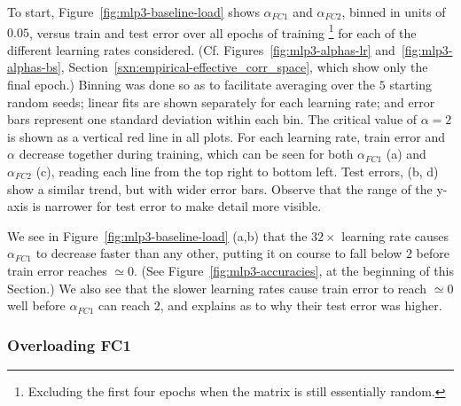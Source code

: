 
To start, Figure~\ref{fig:mlp3-baseline-load} shows $\alpha_{FC1}$ and $\alpha_{FC2}$, binned in units of $0.05$, versus 
train and test error over all epochs of training
\footnote{Excluding the first four epochs when the matrix is still essentially random.} 
for each of the different learning rates considered. 
(Cf. Figures~\ref{fig:mlp3-alphas-lr} and~\ref{fig:mlp3-alphas-bs}, Section~\ref{sxn:empirical-effective_corr_space},
which show only the final epoch.)
Binning was done so as to facilitate averaging over the $5$ starting random seeds; 
linear fits are shown separately for each learning rate; and
error bars represent one standard deviation within each bin. 
The critical value of $\alpha=2$ is shown as a vertical red line in all plots. 
For each learning rate, train error and $\alpha$ decrease together during training, which can be seen for both 
$\alpha_{FC1}$ (a) and $\alpha_{FC2}$ (c), reading each line from the top right to bottom left. Test errors, (b, d) show 
a similar trend, but with wider error bars. 
Observe that the range of the y-axis is narrower for test error to make detail more visible.

We see in Figure~\ref{fig:mlp3-baseline-load} (a,b) 
that the $32\times$ learning rate causes $\alpha_{FC1}$ to decrease faster than any other, putting it on course to 
fall below $2$ before train error reaches $\simeq 0$. 
(See Figure~\ref{fig:mlp3-accuracies}, at the beginning of this Section.) 
We also see that the slower learning rates cause train error to reach $\simeq 0$ well before $\alpha_{FC1}$ can reach $2$, and explains as to why their test error was higher.



\subsubsection{Overloading FC1}
\label{sxn:hysteresis_effect_FC1}


